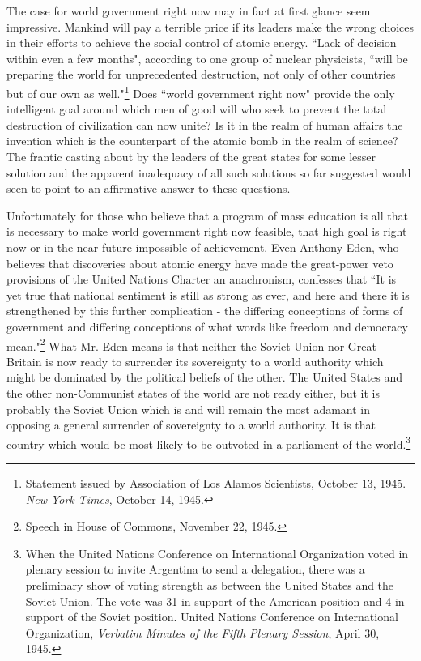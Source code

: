 The case for world government right now may in fact at first glance seem impressive. Mankind will pay a terrible price if its leaders make the wrong choices in their efforts to achieve the social control of atomic energy. ``Lack of decision within even a few months", according to one group of nuclear physicists, ``will be preparing the world for unprecedented destruction, not only of other countries but of our own as well."\footnote{Statement issued by Association of Los Alamos Scientists, October 13, 1945. \textit{New York Times}, October 14, 1945.} Does ``world government right now" provide the only intelligent goal around which men of good will who seek to prevent the total destruction of civilization can now unite? Is it in the realm of human affairs the invention which is the counterpart of the atomic bomb in the realm of science? The frantic casting about by the leaders of the great states for some lesser solution and the apparent inadequacy of all such solutions so far suggested would seen to point to an affirmative answer to these questions.

Unfortunately for those who believe that a program of mass education is all that is necessary to make world government right now feasible, that high goal is right now or in the near future impossible of achievement. Even Anthony Eden, who believes that discoveries about atomic energy have made the great-power veto provisions of the United Nations Charter an anachronism, confesses that ``It is yet true that national sentiment is still as strong as ever, and here and there it is strengthened by this further complication - the differing conceptions of forms of government and differing conceptions of what words like freedom and democracy mean."\footnote{Speech in House of Commons, November 22, 1945.} What Mr. Eden means is that neither the Soviet Union nor Great Britain is now ready to surrender its sovereignty to a world authority which might be dominated by the political beliefs of the other. The United States and the other non-Communist states of the world are not ready either, but it is probably the Soviet Union which is and will remain the most adamant in opposing a general surrender of sovereignty to a world authority. It is that country which would be most likely to be outvoted in a parliament of the world.\footnote{When the United Nations Conference on International Organization voted in plenary session to invite Argentina to send a delegation, there was a preliminary show of voting strength as between the United States and the Soviet Union. The vote was 31 in support of the American position and 4 in support of the Soviet position. United Nations Conference on International Organization, \textit{Verbatim Minutes of the Fifth Plenary Session}, April 30, 1945.}

